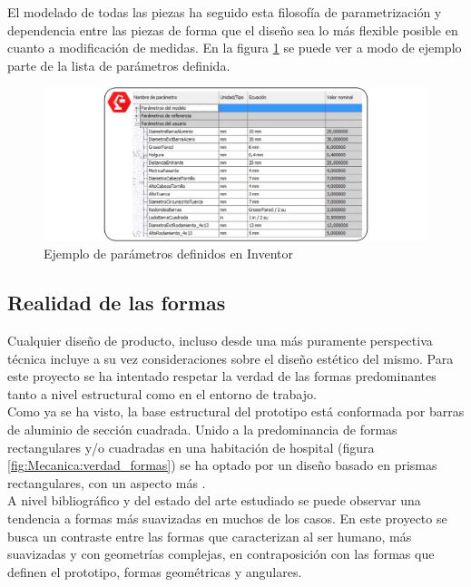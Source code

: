     El modelado de todas las piezas ha seguido esta filosofía de parametrización y dependencia entre las piezas de forma que el diseño sea lo más flexible posible en cuanto a modificación de medidas. En la figura \ref{fig:Mecanica:diseno_parametrico} se puede ver a modo de ejemplo parte de la lista de parámetros definida.

    \begin{figure}[H]
        \centering
        \includegraphics[width=\textwidth]{figuras/Imagenes_Mecanica/diseno_parametrico.jpg}
        \caption{Ejemplo de parámetros definidos en Inventor}
        \label{fig:Mecanica:diseno_parametrico}
    \end{figure}

\subsection{Realidad de las formas}
    Cualquier diseño de producto, incluso desde una más puramente perspectiva técnica incluye a su vez consideraciones sobre el diseño estético del mismo. Para este proyecto se ha intentado respetar la verdad de las formas predominantes tanto a nivel estructural como en el entorno de trabajo.
    \\

    Como ya se ha visto, la base estructural del prototipo está conformada por barras de aluminio de sección cuadrada. Unido a la predominancia de formas rectangulares y/o cuadradas en una habitación de hospital (figura \ref{fig:Mecanica:verdad_formas}) se ha optado por un diseño basado en prismas rectangulares, con un aspecto más .
    \\

    A nivel bibliográfico y del estado del arte estudiado se puede observar una tendencia a formas más suavizadas en muchos de los casos. En este proyecto se busca un contraste entre las formas que caracterizan al ser humano, más suavizadas y con geometrías complejas, en contraposición con las formas que definen el prototipo, formas geométricas y angulares.

